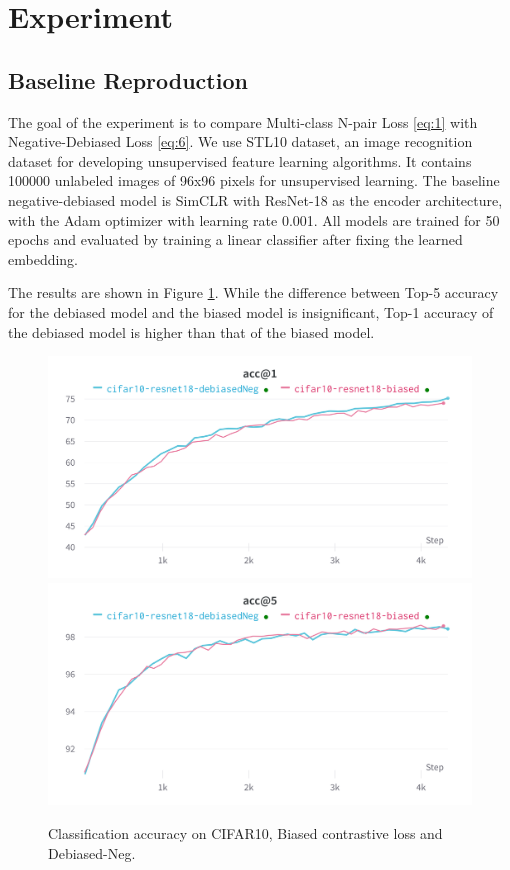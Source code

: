 \documentclass{article}
\begin{document}
\section{Experiment}
\subsection{Baseline Reproduction}

The goal of the experiment is to compare Multi-class N-pair Loss \ref{eq:1} with Negative-Debiased Loss \ref{eq:6}. We use STL10 \citep{pmlr-v15-coates11a} dataset, an image recognition dataset for developing unsupervised feature learning algorithms. It contains 100000 unlabeled images of 96x96 pixels for unsupervised learning. The baseline negative-debiased model is SimCLR \citep{Chen2020SimCLR} with ResNet-18 \citep{7780459} as the encoder architecture, with the Adam optimizer \citep{Diederik2014Adam} with learning rate 0.001. All models are trained for 50 epochs and evaluated by training a linear classifier after fixing the learned embedding.

 The results are shown in Figure \ref{fig:fig1}. While the difference between Top-5 accuracy for the debiased model and the biased model is insignificant, Top-1 accuracy of the debiased model is higher than that of the biased model. 

\begin{figure}[!htb]
\includegraphics[width=\linewidth]{figures/baseline_acc1.png}
\endminipage\hfill
{}
\includegraphics[width=\linewidth]{figures/baseline_acc5.png}
\endminipage
\caption{Classification accuracy on CIFAR10, Biased contrastive loss and Debiased-Neg.}
\label{fig:fig1}
\end{figure}
\end{document}

